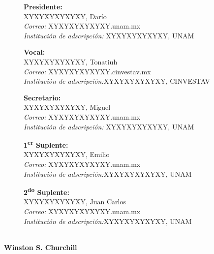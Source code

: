 \documentclass[11pt,twoside,openright,spanish]{report}
\numberwithin{equation}{chapter}
\numberwithin{figure}{chapter}
\numberwithin{table}{chapter}
\newenvironment{changemargin}[3]{
	\begin{list}{}{
			\setlength{\topsep}{#3}
			\setlength{\leftmargin}{#1}
			\setlength{\rightmargin}{#2}
			\setlength{\listparindent}{\parindent}
			\setlength{\itemindent}{\parindent}
			\setlength{\parsep}{\parskip}
		}
		\item[]}{\end{list}}
\begin{document}
\begin{changemargin}{1cm}{0cm}{1cm}
\begin{description}
			\item[]\textbf{Presidente:}\\
			XYXYXYXYXYXY, Darío\\
			\textit{Correo:} XYXYXYXYXYXY.unam.mx\\
			\textit{Institución de adscripción:} XYXYXYXYXYXY, UNAM
			\item[]\textbf{Vocal:}\\
			XYXYXYXYXYXY, Tonatiuh\\
			\textit{Correo:} XYXYXYXYXYXY.cinvestav.mx \\
			\textit{Institución de adscripción:}XYXYXYXYXYXY, CINVESTAV
			\item[]\textbf{Secretario:}\\
			XYXYXYXYXYXY, Miguel\\
			\textit{Correo:} XYXYXYXYXYXY.unam.mx\\
			\textit{Institución de adscripción:} XYXYXYXYXYXY, UNAM
			\item[]\textbf{1\textsuperscript{er} Suplente:}\\
			XYXYXYXYXYXY, Emilio\\
			\textit{Correo:} XYXYXYXYXYXY.unam.mx\\
			\textit{Institución de adscripción:}XYXYXYXYXYXY, UNAM
			\item[]\textbf{2\textsuperscript{do} Suplente:}\\
			XYXYXYXYXYXY, Juan Carlos\\
			\textit{Correo:} XYXYXYXYXYXY.unam.mx\\
			\textit{Institución de adscripción:}XYXYXYXYXYXY, UNAM
		\end{description}
		\thispagestyle{empty}
	\end{changemargin}
	
	
	\ChTitleVar{\raggedright\Large\sffamily\bfseries}
	
	\evensidemargin 0in 
	\oddsidemargin 0.6in
	
	\newpage{\ } 
	\thispagestyle{empty}
	
	\begin{dedication}
		{\Large{}}\\
		\vspace{0.5cm}
		{\normalsize{\bfseries{Winston S. Churchill}}}
	\end{dedication}
	
\end{document}
